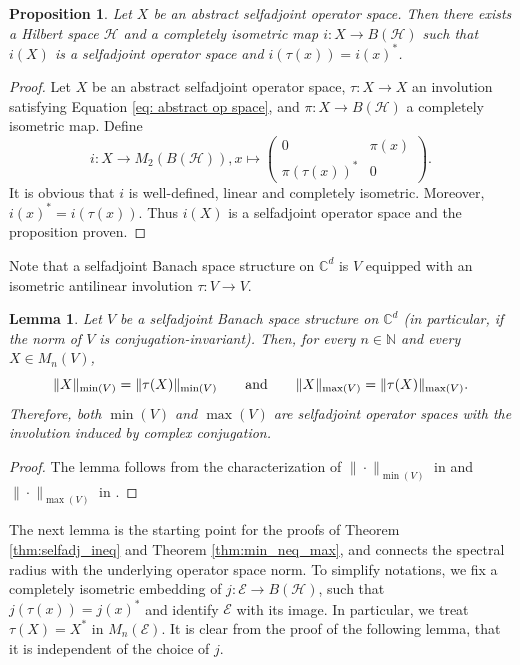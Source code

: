 \documentclass[12pt]{amsart}
\numberwithin{equation}{section}
\newtheorem{lemma}[theorem]{Lemma}
\newtheorem{proposition}[theorem]{Proposition}
\theoremstyle{definition}
\newcommand{\cE}{\mathcal{E}}
\newcommand{\cH}{\mathcal{H}}
\newcommand{\C}{\mathbb{C}}
\newcommand{\bN}{\mathbb{N}}
\begin{document}
\begin{proposition}\label{prop:abs selfadj opspace}
    Let $X$ be an abstract selfadjoint operator space. Then there exists a Hilbert space $\cH$ and a completely isometric map $i:X\to B(\cH)$ such that $i(X)$ is a selfadjoint operator space and $i(\tau(x))=i(x)^*$.
\end{proposition}

\begin{proof}
    Let $X$ be an abstract selfadjoint operator space, $\tau:X\to X$ an involution satisfying Equation \ref{eq: abstract op space}, and $\pi:X\to B(\cH)$ a completely isometric map. Define
      \[
        i:X\to M_2( B(\cH)), x\mapsto \begin{pmatrix} 0 & \pi(x)\\ \pi(\tau(x))^* & 0 \end{pmatrix}.
      \]
    It is obvious that $i$ is well-defined, linear and completely isometric. Moreover, $i(x)^*=i(\tau(x))$. Thus $i(X)$ is a selfadjoint operator space and the proposition proven.
\end{proof}


Note that a selfadjoint Banach space structure on $\C^d$ is $V$ equipped with an isometric antilinear involution $\tau \colon V \to V$. 

\begin{lemma}\label{lem: isometric adjoint}
    Let $V$ be a selfadjoint Banach space structure on $\C^d$ (in particular, if the norm of $V$ is conjugation-invariant). Then, for every $n \in \bN$ and every $X\in M_n(V)$,
      \[
        \|X\|_{\min(V)}=\|\tau(X)\|_{\min(V)} \qquad \textup{and} \qquad \|X\|_{\max(V)}=\|\tau(X)\|_{\max(V)}.
      \]
      Therefore, both $\min(V)$ and $\max(V)$ are selfadjoint operator spaces with the involution induced by complex conjugation.
\end{lemma}

\begin{proof}
    The lemma follows from the characterization of $\|\cdot\|_{\min(V)}$ in \cite[Theorem 14.1]{Paulsen-book} and $\|\cdot\|_{\max(V)}$ in \cite[Theorem 14.2]{Paulsen-book}.
\end{proof}

The next lemma is the starting point for the proofs of Theorem \ref{thm:selfadj_ineq} and Theorem \ref{thm:min_neq_max}, and connects the spectral radius with the underlying operator space norm. To simplify notations, we fix a completely isometric embedding of $j \colon \cE \to B(\cH)$, such that $j(\tau(x)) = j(x)^*$ and identify $\cE$ with its image. In particular, we treat $\tau(X) = X^*$ in $M_n(\cE)$. It is clear from the proof of the following lemma, that it is independent of the choice of $j$. 
\end{document}
